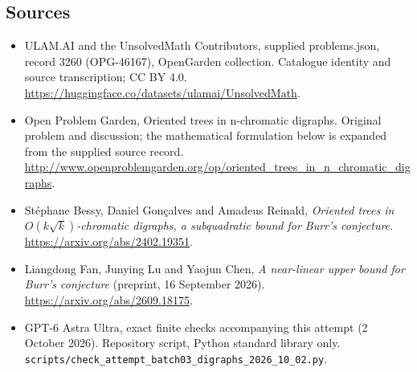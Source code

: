\documentclass[11pt,a4paper]{article}
\begin{document}
\subsection{Sources}
\begin{itemize}
\item[S1] ULAM.AI and the UnsolvedMath Contributors, supplied problems.json, record 3260 (OPG-46167), OpenGarden collection. Catalogue identity and source transcription; CC BY 4.0.
\url{https://huggingface.co/datasets/ulamai/UnsolvedMath}.
\item[S2] Open Problem Garden, Oriented trees in n-chromatic digraphs. Original problem and discussion; the mathematical formulation below is expanded from the supplied source record.
\url{http://www.openproblemgarden.org/op/oriented_trees_in_n_chromatic_digraphs}.
\item[S3] St\'ephane Bessy, Daniel Gon\c calves and Amadeus Reinald, \emph{Oriented trees in $O(k\sqrt{k})$-chromatic digraphs, a subquadratic bound for Burr's conjecture}. \url{https://arxiv.org/abs/2402.19351}.
\item[S4] Liangdong Fan, Junying Lu and Yaojun Chen, \emph{A near-linear upper bound for Burr's conjecture} (preprint, 16 September 2026). \url{https://arxiv.org/abs/2609.18175}.
\item[S9] GPT-6 Astra Ultra, exact finite checks accompanying this attempt (2 October 2026). Repository script, Python standard library only. \texttt{scripts/check\_attempt\_batch03\_digraphs\_2026\_10\_02.py}.
\end{itemize}
\end{document}
